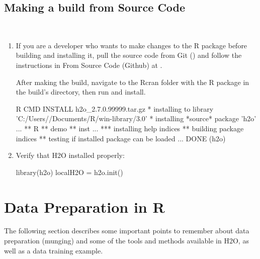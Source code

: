 \documentclass[11pt]{article}
\begin{document}
\subsection{Making a build from Source Code} \begin{enumerate}
\item If you are a developer who wants to make changes to the R package before building and installing it, pull the source code from Git () and follow the instructions in From Source Code (Github) at .

After making the build, navigate to the Rcran folder with the R package in the build’s directory, then run and install.
\begin{spverbatim}

 R CMD INSTALL h2o_2.7.0.99999.tar.gz
* installing to library 'C:/Users//Documents/R/win-library/3.0'
* installing *source* package 'h2o' ...
** R
** demo
** inst
...
*** installing help indices
** building package indices
** testing if installed package can be loaded
...
DONE (h2o)
\end{spverbatim}


\item Verify that H2O installed properly:
\begin{spverbatim}

 library(h2o)
 localH2O = h2o.init()
\end{spverbatim}
\end{enumerate}

\section{Data Preparation in R}

The following section describes some important points to remember about data preparation (munging) and some of the tools and methods available in H2O, as well as a data training example. 
\end{document}
